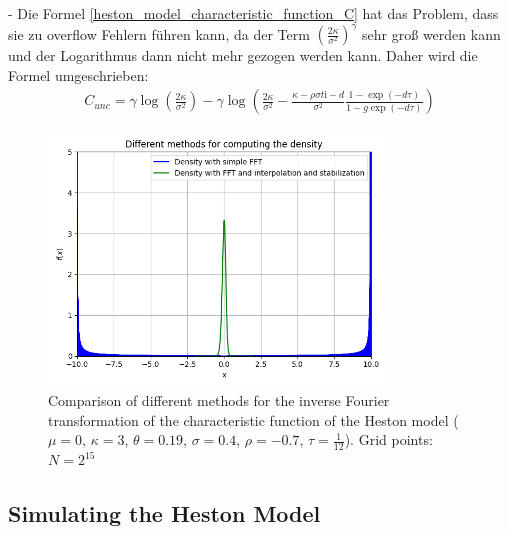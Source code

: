 - Die Formel \eqref{heston_model_characteristic_function_C} hat das Problem, dass sie zu overflow Fehlern führen kann, da der Term $\left(\frac{2\kappa}{\sigma^2}\right)^\gamma$ sehr groß werden kann und der Logarithmus dann nicht mehr gezogen werden kann. Daher wird die Formel umgeschrieben:
\begin{align}
    \label{eq:heston_model_characteristic_function_C_2}
    C_{unc} = \gamma \log\left(\frac{2\kappa}{\sigma^2}\right) - \gamma \log\left(\frac{2\kappa}{\sigma^2} - \frac{\kappa - \rho\sigma t \mathrm{i} - d}{\sigma^2} \frac{1 - \exp(-d \tau)}{1 - g \exp(-d \tau)}\right)
\end{align}

\begin{figure}[h]
    \centering
    \includegraphics[width=0.8\textwidth]{img/different_ifft_methods.png}
    \caption{Comparison of different methods for the inverse Fourier transformation of the characteristic function of the Heston model ($\mu=0$, $\kappa=3$, $\theta=0.19$, $\sigma=0.4$, $\rho=-0.7$, $\tau=\frac{1}{12}$). Grid points: $N=2^{15}$}
    \label{fig:ifft_comparison}
\end{figure}

\subsection{Simulating the Heston Model}

